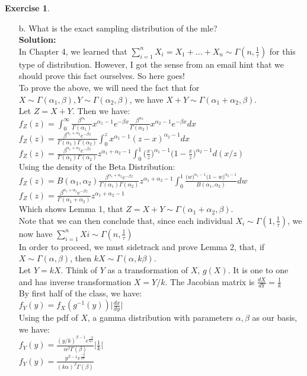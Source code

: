 \documentclass[11pt]{article}
\providecommand{\abs}[1]{\lvert #1 \rvert}
\theoremstyle{definition}
\newtheorem{exercise}[theorem]{Exercise}
\newcommand{\V}{\vspace{0.3cm}\\}
\newcommand{\sol}{\V \textbf{Solution:} \V}
\begin{document}
\begin{exercise}
\begin{enumerate}
\item[b.] What is the exact sampling distribution of the mle? \sol
In Chapter 4, we learned that $\sum_{i=1}^n X_i = X_1 + ... + X_n \sim \Gamma(n, \frac{1}{\tau})$ for this type of distribution. However, I got the sense from an email hint that we should prove this fact ourselves. So here goes!\V
To prove the above, we will need the fact that for $X \sim \Gamma(\alpha_1, \beta), Y \sim \Gamma(\alpha_2, \beta)$, we have $X+Y \sim \Gamma(\alpha_1 + \alpha_2, \beta)$. \V
Let $Z = X+Y$. Then we have: \V
$ \displaystyle f_Z(z) = \int_0^\infty \frac{\beta^{\alpha_1}}{\Gamma(\alpha_1)} x^{\alpha_1 -1} e^{-\beta x} \frac{\beta^{\alpha_2}}{\Gamma(\alpha_2)} x^{\alpha_2 -1} e^{-\beta x} dx $ \V
$ \displaystyle f_Z(z) = \frac{\beta^{\alpha_1 + \alpha_2} e^{-\beta z}}{\Gamma(\alpha_1) \Gamma(\alpha_2)} \int_0^z x^{\alpha_1 -1}(z-x)^{\alpha_2-1} dx$ \V
$ \displaystyle f_Z(z) = \frac{\beta^{\alpha_1 + \alpha_2} e^{-\beta z}}{\Gamma(\alpha_1) \Gamma(\alpha_2)} z^{\alpha_1 + \alpha_2 - 1} \int_0^1 \bigg(\frac{x}{z}\bigg)^{\alpha_1 -1}\bigg(1-\frac{x}{z}\bigg)^{\alpha_2-1} d(x/z)$ \V
Using the density of the Beta Distribution:\\
$ \displaystyle f_Z(z) = B(\alpha_1, \alpha_2) \frac{\beta^{\alpha_1 + \alpha_2} e^{-\beta z}}{\Gamma(\alpha_1) \Gamma(\alpha_2)} z^{\alpha_1 + \alpha_2 - 1} \int_0^1 \frac{\big(w\big)^{\alpha_1 -1}\big(1-w\big)^{\alpha_2-1}}{B(\alpha_1, \alpha_2)} dw$ \V
$ \displaystyle f_Z(z) = \frac{\beta^{\alpha_1 + \alpha_2} e^{-\beta z}}{\Gamma(\alpha_1 + \alpha_2)} z^{\alpha_1 + \alpha_2 - 1}$ \V
Which shows Lemma 1, that $Z = X+Y \sim \Gamma(\alpha_1 + \alpha_2, \beta)$. \V
Note that we can then conclude that, since each individual $X_i \sim \Gamma(1 , \frac{1}{\tau})$, we now have $\sum_{i=1}^n Xi \sim \Gamma(n, \frac{1}{\tau})$ \V
In order to proceed, we must sidetrack and prove Lemma 2, that, if $X \sim \Gamma(\alpha, \beta)$, then $kX \sim \Gamma(\alpha, k\beta)$. \V
Let $Y = kX$. Think of $Y$ as a transformation of $X$, $g(X)$. It is one to one and has inverse transformation $X = Y/k$. The Jacobian matrix is $\frac{dX}{dY} = \frac{1}{k}$ \V
By first half of the class, we have:\\
$f_Y(y) = f_X(g^{-1}(y)) \abs{\frac{dx}{dy}}$\V
Using the pdf of $X$, a gamma distribution with parameters $\alpha, \beta$ as our basis, we have: \V
$\displaystyle f_Y(y) = \frac{(y/k)^{\beta-1} e^{\frac{-y}{k\alpha}} }{\alpha^\beta \Gamma(\beta)}\abs{\frac{1}{k}}$ \V
$\displaystyle f_Y(y) = \frac{y^{\beta-1} e^{\frac{-y}{k\alpha}}}{(k\alpha)^\beta \Gamma(\beta)}$ \V

\end{enumerate}
\end{exercise}
\end{document}
